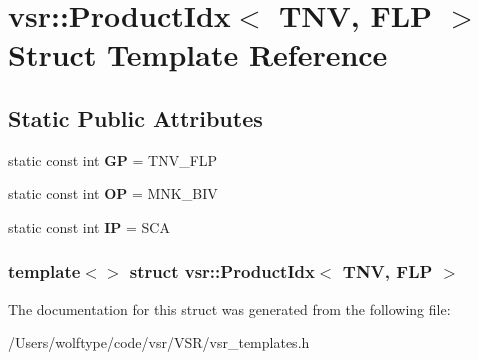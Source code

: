 \hypertarget{structvsr_1_1_product_idx_3_01_t_n_v_00_01_f_l_p_01_4}{\section{vsr\-:\-:Product\-Idx$<$ T\-N\-V, F\-L\-P $>$ Struct Template Reference}
\label{structvsr_1_1_product_idx_3_01_t_n_v_00_01_f_l_p_01_4}
}
\subsection*{Static Public Attributes}
\begin{DoxyCompactItemize}
\item 
\hypertarget{structvsr_1_1_product_idx_3_01_t_n_v_00_01_f_l_p_01_4_a2b4ba85870c149786d4ddda9d18969c7}{static const int {\bfseries G\-P} = T\-N\-V\-\_\-\-F\-L\-P}\label{structvsr_1_1_product_idx_3_01_t_n_v_00_01_f_l_p_01_4_a2b4ba85870c149786d4ddda9d18969c7}

\item 
\hypertarget{structvsr_1_1_product_idx_3_01_t_n_v_00_01_f_l_p_01_4_a6e355ae6895c8533bdf3d79b03667f78}{static const int {\bfseries O\-P} = M\-N\-K\-\_\-\-B\-I\-V}\label{structvsr_1_1_product_idx_3_01_t_n_v_00_01_f_l_p_01_4_a6e355ae6895c8533bdf3d79b03667f78}

\item 
\hypertarget{structvsr_1_1_product_idx_3_01_t_n_v_00_01_f_l_p_01_4_a0f899a4923c44e332041f5b5f750eaab}{static const int {\bfseries I\-P} = S\-C\-A}\label{structvsr_1_1_product_idx_3_01_t_n_v_00_01_f_l_p_01_4_a0f899a4923c44e332041f5b5f750eaab}

\end{DoxyCompactItemize}
\subsubsection*{template$<$$>$ struct vsr\-::\-Product\-Idx$<$ T\-N\-V, F\-L\-P $>$}



The documentation for this struct was generated from the following file\-:\begin{DoxyCompactItemize}
\item 
/\-Users/wolftype/code/vsr/\-V\-S\-R/vsr\-\_\-templates.\-h\end{DoxyCompactItemize}
